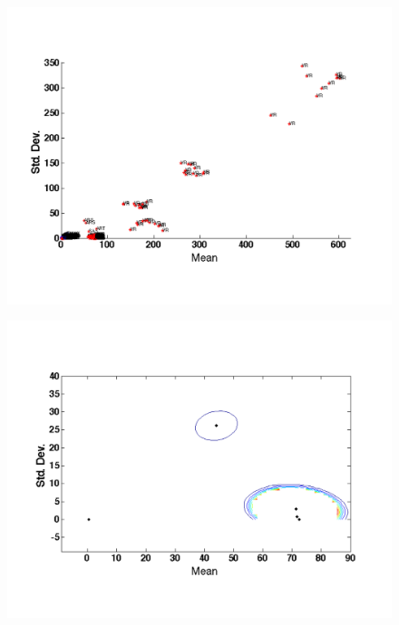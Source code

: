 \begin{figure}[t!] %
\centering
\includegraphics[width=1.0\columnwidth]{figs/VR}
\caption{}
\label{fig:tstreams}
\end{figure}

\begin{figure}[t!] %
\centering
\includegraphics[width=1.0\columnwidth]{figs/gmm_centers}
\caption{}
\label{fig:tstreams}
\end{figure}
